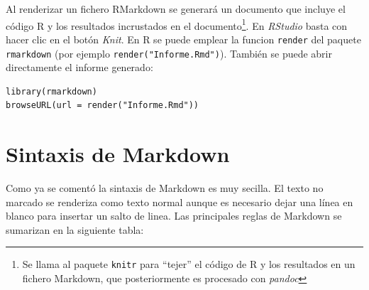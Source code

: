 \documentclass[]{book}
\let\rmarkdownfootnote\footnote%
\def\footnote{\protect\rmarkdownfootnote}
\theoremstyle{definition}
\theoremstyle{definition}
\theoremstyle{definition}
\theoremstyle{remark}
\begin{document}
Al renderizar un fichero RMarkdown se generará un documento que incluye
el código R y los resultados incrustados en el documento\footnote{Se
  llama al paquete \texttt{knitr} para ``tejer'' el código de R y los
  resultados en un fichero Markdown, que posteriormente es procesado con
  \emph{pandoc}}. En \emph{RStudio} basta con hacer clic en el botón
\emph{Knit}. En R se puede emplear la funcion \texttt{render} del
paquete \texttt{rmarkdown} (por ejemplo \texttt{render("Informe.Rmd")}).
También se puede abrir directamente el informe generado:

\begin{verbatim}
library(rmarkdown)
browseURL(url = render("Informe.Rmd"))
\end{verbatim}

\section{Sintaxis de Markdown}\label{markdown}

Como ya se comentó la sintaxis de Markdown es muy secilla. El texto no
marcado se renderiza como texto normal aunque es necesario dejar una
línea en blanco para insertar un salto de linea. Las principales reglas
de Markdown se sumarizan en la siguiente tabla:
\end{document}
